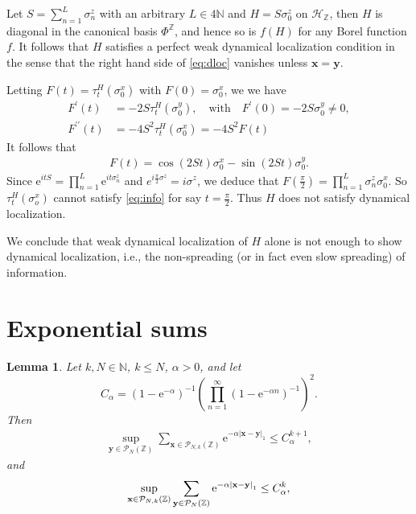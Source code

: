 \documentclass[12pt, a4paper,reqno]{amsart}
\numberwithin{equation}{section}
\newtheorem{lemma}[theorem]{Lemma}
\newcommand\N{\mathbb N}
\newcommand\Z{\mathbb Z}
\newcommand\x{\mathbf{x}}
\newcommand\y{\mathbf{y}}
\newcommand\e{\mathrm{e}}
\newcommand\cH{\mathcal{H}}
\newcommand\cP{\mathcal{P}}
\newcommand{\pr}{\prime}
\newcommand\beq{\begin{equation}}
\newcommand\eeq{\end{equation}}
\newcommand\be{\begin{equation}\begin{aligned}}
\newcommand\ee{\end{aligned}\end{equation}}
\newcommand{\abs}[1]{\left\lvert #1 \right\rvert}
\newcommand{\pa}[1]{\left( #1 \right)}
\newcommand{\eq}[1]{\eqref{#1}}
\newcommand{\qtx}[1]{\quad\text{#1}\quad}
\begin{document}
Let $S=\sum_{n=1}^L\sigma_n^z$ with an arbitrary $L\in4\N$ and $H=S\sigma_0^z$ on $\cH_\Z$, then $H$ is diagonal  in the canonical  basis $\Phi^\Z$, and hence so is    $f(H)$ for any Borel function $f$.  It follows that $H$ satisfies a perfect weak dynamical localization condition in the sense that the right hand side of \eqref{eq:dloc} vanishes unless $\x=\y$. 

Letting $F(t)=\tau_t^H(\sigma_0^x)$ with $F(0)=\sigma_0^x$, we we have
\be
F^\pr(t)&=  -2 S  \tau_t^H(\sigma_0^y), \qtx{with}F^\pr(0)=-2 S  \sigma_0^y \ne 0,\\
F^{\pr\pr}(t)&=  -4 S^2  \tau_t^H(\sigma_0^x)=  -4 S^2  F(t)
\ee 
It follows that 
\be
F(t)=\cos(2St)\sigma_0^x -\sin(2St)\sigma_0^y .
\ee
Since $\e^{itS}=\prod_{n=1}^L\e^{it\sigma_n^z}$ and $e^{i\frac\pi2\sigma^z}=i\sigma^z$, we deduce that $F(\frac\pi2)=\prod_{n=1}^L\sigma_n^z\sigma_0^x$. So $\tau_t^H(\sigma_o^x)$ cannot satisfy \eq{eq:info} for say $t=\frac\pi2$.  Thus $H$ does not satisfy dynamical localization.

We conclude that weak dynamical localization of $H$  alone is not enough to show  dynamical localization, i.e., the non-spreading (or in fact even slow spreading) of information.






\section{Exponential sums}\label{sec:expsum}


\begin{lemma}\label{lem:expsum}
Let  $k,N\in \N$,  $k\le N$,   $\alpha>0$, and let
\beq
C_\alpha=(1-\e^{-\alpha})^{-1} \pa{ \prod_{n=1}^\infty (1- \e^{-\alpha n})^{-1}}^2.
\eeq 
  Then
\be\label{eq:d1bn43}
\sup_{\y\in \cP_{N}(\Z)} \sum_{{\x}\in\cP_{N,k}(\Z)} \e^{-\alpha \abs{\x-\y}_1}\le  C_{\alpha}^{k+1} ,
\ee 
and
\be\label{eq:d1bn}
\sup_{\x\in \cP_{N,k}(\Z)} \sum_{{\bf y}\in\cP_{N}(\Z)} \e^{-\alpha \abs{\x-\y}_1}\le C_{\alpha}^k ,
\ee  
\end{lemma}
\end{document}
